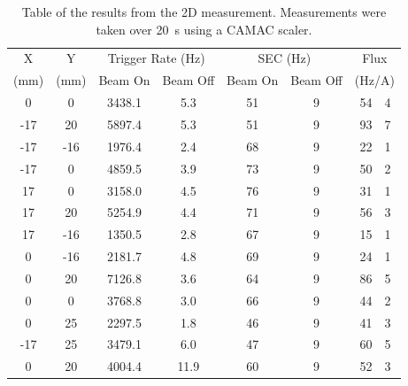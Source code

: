  \begin{table}
    \begin{center}
    \begin{tabular}{c|c|c|c|c|c|r@{\( \pm \)}l}
        X     &   Y    &  \multicolumn{2}{c|}{Trigger Rate (Hz)}  &  \multicolumn{2}{c|}{SEC (Hz)}  &  \multicolumn{2}{c}{Flux}     \\
        (mm)  &  (mm)  &  Beam On          &  Beam Off        &  Beam On    &  Beam Off    &  \multicolumn{2}{c}{(Hz/A)}   \\
        \hline %
          0  &    0    &   3438.1          &    5.3           &      51     &           9  & 54  &  4 \\
        -17  &   20    &   5897.4          &    5.3           &      51     &           9  & 93  &  7 \\
        -17  &  -16    &   1976.4          &    2.4           &      68     &           9  & 22  &  1 \\
        -17  &    0    &   4859.5          &    3.9           &      73     &           9  & 50  &  2 \\
         17  &    0    &   3158.0          &    4.5           &      76     &           9  & 31  &  1 \\
         17  &   20    &   5254.9          &    4.4           &      71     &           9  & 56  &  3 \\
         17  &  -16    &   1350.5          &    2.8           &      67     &           9  & 15  &  1 \\
          0  &  -16    &   2181.7          &    4.8           &      69     &           9  & 24  &  1 \\
          0  &   20    &   7126.8          &    3.6           &      64     &           9  & 86  &  5 \\
          0  &    0    &   3768.8          &    3.0           &      66     &           9  & 44  &  2 \\
          \hline
          0  &   25    &   2297.5          &    1.8           &      46     &           9  & 41  &  3 \\
        -17  &   25    &   3479.1          &    6.0           &      47     &           9  & 60  &  5 \\
          0  &   20    &   4004.4          &   11.9           &      60     &           9  & 52  &  3 \\
    \end{tabular}
    \end{center}
    \caption{Table of the results from the 2D measurement. Measurements were taken over 20~s using a CAMAC scaler.}
 \end{table}
 
